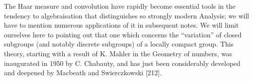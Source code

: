 The Haar measure and convolution have rapidly become essential tools in the tendency to algebraisation that distinguishes so strongly modern Analysis; we will have to mention numerous applications of it in subsequent notes. We will limit ourselves here to pointing out that one which concerns the ``variation'' of closed subgroups (and notably discrete subgroups) of a locally compact group. This theory, starting with a result of K. Mahler in the Geometry of numbers, was inaugurated in 1950 by C. Chabauty, and has just been considerably developed and deepened by Macbeath and Swierczkowski {[}212{]}.

